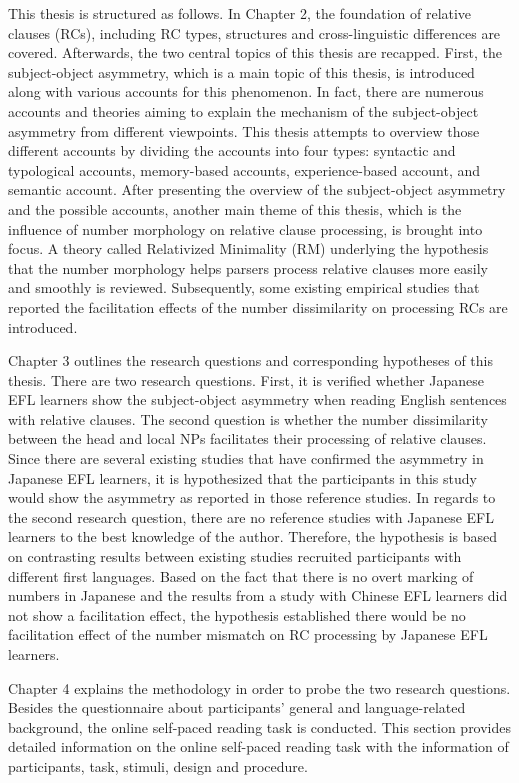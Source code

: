 \documentclass[
]{article}
\begin{document}
This thesis is structured as follows. In Chapter 2, the foundation of
relative clauses (RCs), including RC types, structures and
cross-linguistic differences are covered. Afterwards, the two central
topics of this thesis are recapped. First, the subject-object asymmetry,
which is a main topic of this thesis, is introduced along with various
accounts for this phenomenon. In fact, there are numerous accounts and
theories aiming to explain the mechanism of the subject-object asymmetry
from different viewpoints. This thesis attempts to overview those
different accounts by dividing the accounts into four types: syntactic
and typological accounts, memory-based accounts, experience-based
account, and semantic account. After presenting the overview of the
subject-object asymmetry and the possible accounts, another main theme
of this thesis, which is the influence of number morphology on relative
clause processing, is brought into focus. A theory called Relativized
Minimality (RM) underlying the hypothesis that the number morphology
helps parsers process relative clauses more easily and smoothly is
reviewed. Subsequently, some existing empirical studies that reported
the facilitation effects of the number dissimilarity on processing RCs
are introduced.

Chapter 3 outlines the research questions and corresponding hypotheses
of this thesis. There are two research questions. First, it is verified
whether Japanese EFL learners show the subject-object asymmetry when
reading English sentences with relative clauses. The second question is
whether the number dissimilarity between the head and local NPs
facilitates their processing of relative clauses. Since there are
several existing studies that have confirmed the asymmetry in Japanese
EFL learners, it is hypothesized that the participants in this study
would show the asymmetry as reported in those reference studies. In
regards to the second research question, there are no reference studies
with Japanese EFL learners to the best knowledge of the author.
Therefore, the hypothesis is based on contrasting results between
existing studies recruited participants with different first languages.
Based on the fact that there is no overt marking of numbers in Japanese
and the results from a study with Chinese EFL learners did not show a
facilitation effect, the hypothesis established there would be no
facilitation effect of the number mismatch on RC processing by Japanese
EFL learners.

Chapter 4 explains the methodology in order to probe the two research
questions. Besides the questionnaire about participants' general and
language-related background, the online self-paced reading task is
conducted. This section provides detailed information on the online
self-paced reading task with the information of participants, task,
stimuli, design and procedure.
\end{document}
